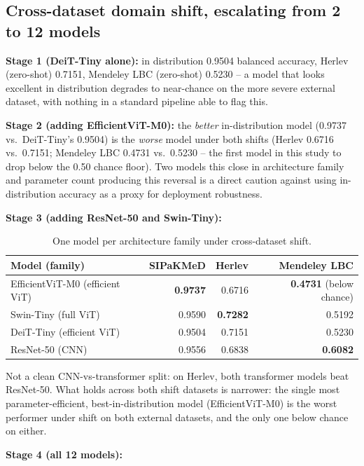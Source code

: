 \documentclass[runningheads]{llncs}
\begin{document}
\subsection{Cross-dataset domain shift, escalating from 2 to 12 models}

\textbf{Stage 1 (DeiT-Tiny alone):} in distribution 0.9504 balanced
accuracy, Herlev (zero-shot) 0.7151, Mendeley LBC (zero-shot) 0.5230 -- a
model that looks excellent in distribution degrades to near-chance on the
more severe external dataset, with nothing in a standard pipeline able to
flag this.

\textbf{Stage 2 (adding EfficientViT-M0):} the \emph{better}
in-distribution model (0.9737 vs.\ DeiT-Tiny's 0.9504) is the
\emph{worse} model under both shifts (Herlev 0.6716 vs.\ 0.7151; Mendeley
LBC 0.4731 vs.\ 0.5230 -- the first model in this study to drop below the
0.50 chance floor). Two models this close in architecture family and
parameter count producing this reversal is a direct caution against using
in-distribution accuracy as a proxy for deployment robustness.

\textbf{Stage 3 (adding ResNet-50 and Swin-Tiny):}

\begin{table}[htbp]
\centering
\caption{One model per architecture family under cross-dataset shift.}
\label{tab:rq4-stage3}
\begin{tabular}{lrrr}
\toprule
Model (family) & SIPaKMeD & Herlev & Mendeley LBC \\
\midrule
EfficientViT-M0 (efficient ViT) & \textbf{0.9737} & 0.6716 & \textbf{0.4731} (below chance) \\
Swin-Tiny (full ViT) & 0.9590 & \textbf{0.7282} & 0.5192 \\
DeiT-Tiny (efficient ViT) & 0.9504 & 0.7151 & 0.5230 \\
ResNet-50 (CNN) & 0.9556 & 0.6838 & \textbf{0.6082} \\
\bottomrule
\end{tabular}
\end{table}

Not a clean CNN-vs-transformer split: on Herlev, both transformer models
beat ResNet-50. What holds across both shift datasets is narrower: the
single most parameter-efficient, best-in-distribution model
(EfficientViT-M0) is the worst performer under shift on both external
datasets, and the only one below chance on either.

\textbf{Stage 4 (all 12 models):}
\end{document}
